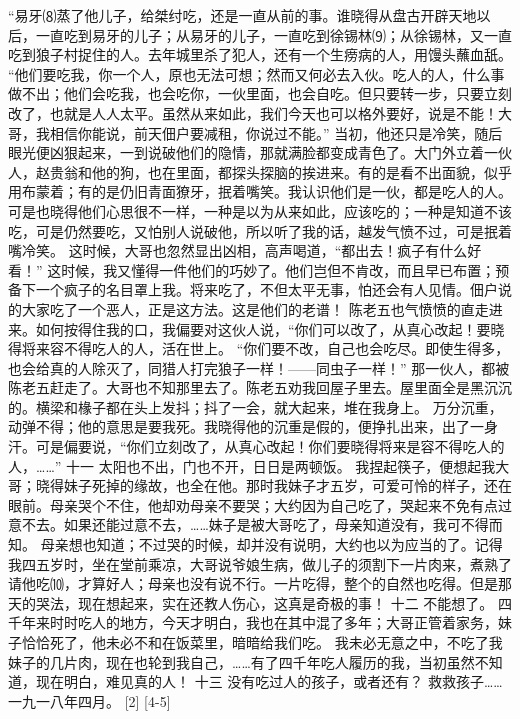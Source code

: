 \documentclass[12pt,UTF8]{ctexbook}
\begin{document}
“易牙⑻蒸了他儿子，给桀纣吃，还是一直从前的事。谁晓得从盘古开辟天地以后，一直吃到易牙的儿子；从易牙的儿子，一直吃到徐锡林⑼；从徐锡林，又一直吃到狼子村捉住的人。去年城里杀了犯人，还有一个生痨病的人，用馒头蘸血舐。
“他们要吃我，你一个人，原也无法可想；然而又何必去入伙。吃人的人，什么事做不出；他们会吃我，也会吃你，一伙里面，也会自吃。但只要转一步，只要立刻改了，也就是人人太平。虽然从来如此，我们今天也可以格外要好，说是不能！大哥，我相信你能说，前天佃户要减租，你说过不能。”
当初，他还只是冷笑，随后眼光便凶狠起来，一到说破他们的隐情，那就满脸都变成青色了。大门外立着一伙人，赵贵翁和他的狗，也在里面，都探头探脑的挨进来。有的是看不出面貌，似乎用布蒙着；有的是仍旧青面獠牙，抿着嘴笑。我认识他们是一伙，都是吃人的人。可是也晓得他们心思很不一样，一种是以为从来如此，应该吃的；一种是知道不该吃，可是仍然要吃，又怕别人说破他，所以听了我的话，越发气愤不过，可是抿着嘴冷笑。
这时候，大哥也忽然显出凶相，高声喝道，“都出去！疯子有什么好看！”
这时候，我又懂得一件他们的巧妙了。他们岂但不肯改，而且早已布置；预备下一个疯子的名目罩上我。将来吃了，不但太平无事，怕还会有人见情。佃户说的大家吃了一个恶人，正是这方法。这是他们的老谱！
陈老五也气愤愤的直走进来。如何按得住我的口，我偏要对这伙人说，“你们可以改了，从真心改起！要晓得将来容不得吃人的人，活在世上。
“你们要不改，自己也会吃尽。即使生得多，也会给真的人除灭了，同猎人打完狼子一样！——同虫子一样！”
那一伙人，都被陈老五赶走了。大哥也不知那里去了。陈老五劝我回屋子里去。屋里面全是黑沉沉的。横梁和椽子都在头上发抖；抖了一会，就大起来，堆在我身上。
万分沉重，动弹不得；他的意思是要我死。我晓得他的沉重是假的，便挣扎出来，出了一身汗。可是偏要说，“你们立刻改了，从真心改起！你们要晓得将来是容不得吃人的人，……”
十一
太阳也不出，门也不开，日日是两顿饭。
我捏起筷子，便想起我大哥；晓得妹子死掉的缘故，也全在他。那时我妹子才五岁，可爱可怜的样子，还在眼前。母亲哭个不住，他却劝母亲不要哭；大约因为自己吃了，哭起来不免有点过意不去。如果还能过意不去，……妹子是被大哥吃了，母亲知道没有，我可不得而知。
母亲想也知道；不过哭的时候，却并没有说明，大约也以为应当的了。记得我四五岁时，坐在堂前乘凉，大哥说爷娘生病，做儿子的须割下一片肉来，煮熟了请他吃⑽，才算好人；母亲也没有说不行。一片吃得，整个的自然也吃得。但是那天的哭法，现在想起来，实在还教人伤心，这真是奇极的事！
十二
不能想了。
四千年来时时吃人的地方，今天才明白，我也在其中混了多年；大哥正管着家务，妹子恰恰死了，他未必不和在饭菜里，暗暗给我们吃。
我未必无意之中，不吃了我妹子的几片肉，现在也轮到我自己，……有了四千年吃人履历的我，当初虽然不知道，现在明白，难见真的人！
十三
没有吃过人的孩子，或者还有？
救救孩子……
一九一八年四月。 [2] [4-5]
\backmatter
\end{document}
